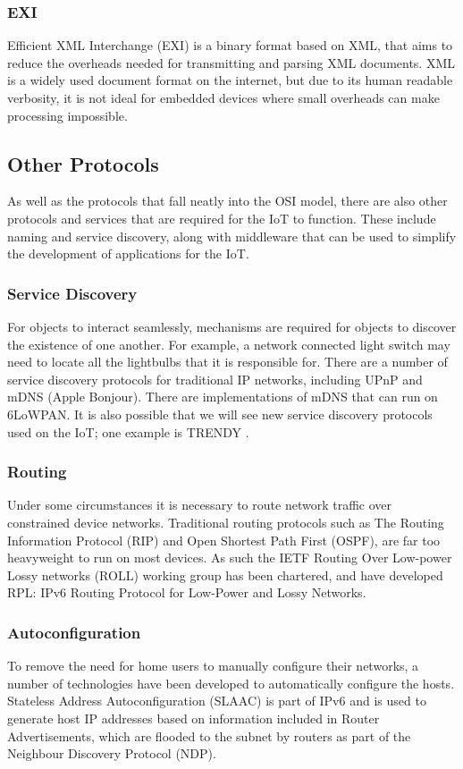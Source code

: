 \documentclass[10pt,journal,compsoc]{IEEEtran}
\begin{document}
\subsubsection{EXI}
Efficient XML Interchange (EXI) is a binary format based on XML, that aims to
reduce the overheads needed for transmitting and parsing XML documents. XML is
a widely used document format on the internet, but due to its human readable
verbosity, it is not ideal for embedded devices where small overheads can make
processing impossible. 

\subsection{Other Protocols}
As well as the protocols that fall neatly into the OSI model, there are also
other protocols and services that are required for the IoT to function. These
include naming and service discovery, along with middleware that can be used to
simplify the development of applications for the IoT.

\subsubsection{Service Discovery}
For objects to interact seamlessly, mechanisms are required for objects to
discover the existence of one another. For example, a network connected light
switch may need to locate all the lightbulbs that it is responsible for. There
are a number of service discovery protocols for traditional IP networks,
including UPnP and mDNS (Apple Bonjour). There are implementations of mDNS
that can run on 6LoWPAN. It is also possible that we will see new service
discovery protocols used on the IoT; one example is TRENDY \cite{Butt2013}. 

\subsubsection{Routing}
Under some circumstances it is necessary to route network traffic over
constrained device networks. Traditional routing protocols such as The Routing
Information Protocol (RIP) and Open Shortest Path First (OSPF), are far too
heavyweight to run on most devices. As such the IETF Routing Over Low-power
Lossy networks (ROLL) working group has been chartered, and have developed RPL:
IPv6 Routing Protocol for Low-Power and Lossy Networks.  

\subsubsection{Autoconfiguration}
To remove the need for home users to manually configure their networks, a number of
technologies have been developed to automatically configure the hosts.
Stateless Address Autoconfiguration (SLAAC) is part of IPv6 and is used to
generate host IP addresses based on information included in Router
Advertisements, which are flooded to the subnet by routers as part of the
Neighbour Discovery Protocol (NDP). 
\end{document}
